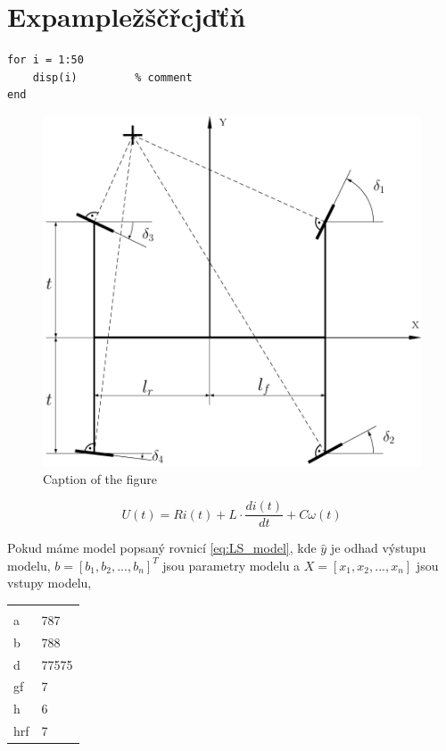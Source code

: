 \chapter{Expampležščřcjďťň}
\label{chap:Expample}

\lipsum[1]

\begin{lstlisting}
for i = 1:50
	disp(i)			% comment         
end
\end{lstlisting}

\begin{figure}[!h] 
	\begin{center}
		\includegraphics[scale=0.4]{images/example_fig.pdf}
	\end{center}
	\caption[Caption in list of figures]{Caption of the figure}
	\label{fig:figurelabel}
\end{figure}	

\lipsum[2]

\begin{equation}\label{eq:DCmot}
U(t) = Ri(t) + L\cdot\frac{di(t)}{dt} + C\omega(t)
\end{equation}

Pokud máme model popsaný rovnicí \ref{eq:LS_model}, kde \boldmath $\hat{y}$ je odhad výstupu modelu, $b = \left[b_1,b_2,...,b_n\right]^T$ jsou parametry modelu a $X = \left[x_1,x_2,...,x_n\right]$ jsou vstupy modelu, \unboldmath

\begin{center}
	\begin{tabular}{ll}
		&  \\ 
		a & 787 \\ 
		b & 788 \\ 
		d & 77575 \\ 
		gf & 7 \\ 
		h & 6 \\ 
		hrf & 7 \\ 
	\end{tabular} 
\end{center}


